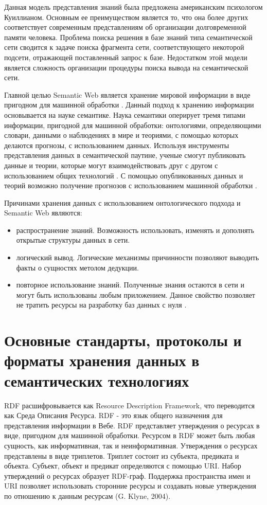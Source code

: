 Данная модель представления знаний была предложена американским психологом Куиллианом. Основным ее преимуществом является то, что она более других соответствует современным представлениям об организации долговременной памяти человека. Проблема поиска решения в базе знаний типа семантической сети сводится к задаче поиска фрагмента сети, соответствующего некоторой подсети, отражающей поставленный запрос к базе. Недостатком этой модели является сложность организации процедуры поиска вывода на семантической сети.

Главной целью Semantic Web является хранение мировой информации в виде пригодном для машинной обработки \cite{berners2001semantic}. Данный подход к хранению информации основывается на науке семантике. Наука семантики оперирует тремя типами информации, пригодной для машинной обработки: онтологиями, определяющими словари, данными о наблюдениях в мире и теориями, с помощью которых делаются прогнозы, с использованием данных. Используя инструменты представления данных в семантической паутине, ученые смогут публиковать данные и теории, которые могут взаимодействовать друг с другом с использованием общих технологий \cite{hendler2003science}. С помощью опубликованных данных и теорий возможно получение прогнозов с использованием машинной обработки \cite{poole2008semantic}. 

Причинами хранения данных с использованием онтологического подхода и Semantic Web являются:

\begin{itemize}
\item распространение знаний. Возможность использовать, изменять и дополнять открытые структуры данных в сети.
\item логический вывод. Логические механизмы причинности позволяют выводить факты о сущностях метолом дедукции.
\item повторное использование знаний. Полученные знания остаются в сети и могут быть использованы любым приложением. Данное свойство позволяет не тратить ресурсы на разработку баз данных с нуля \cite{wang2004ontology}. 
\end{itemize}


\section{Основные стандарты, протоколы и форматы хранения данных в семантических технологиях} \label{sect2_3}

RDF расшифровывается как Resource Description Framework, что переводится как Среда Описания Ресурса. RDF - это язык общего назначения для представления информации в Вебе. RDF представляет утверждения о ресурсах в виде, пригодном для машинной обработки. Ресурсом в RDF может быть любая сущность, как информативная, так и неинформативная. Утверждения о ресурсах представлены в виде триплетов. Триплет состоит из субъекта, предиката и объекта. Субъект, объект и предикат определяются с помощью URI. Набор утверждений о ресурсах образует RDF-граф. Поддержка пространства имен и URI позволяет использовать сторонние ресурсы и создавать новые утверждения по отношению к данным ресурсам (G. Klyne, 2004).

